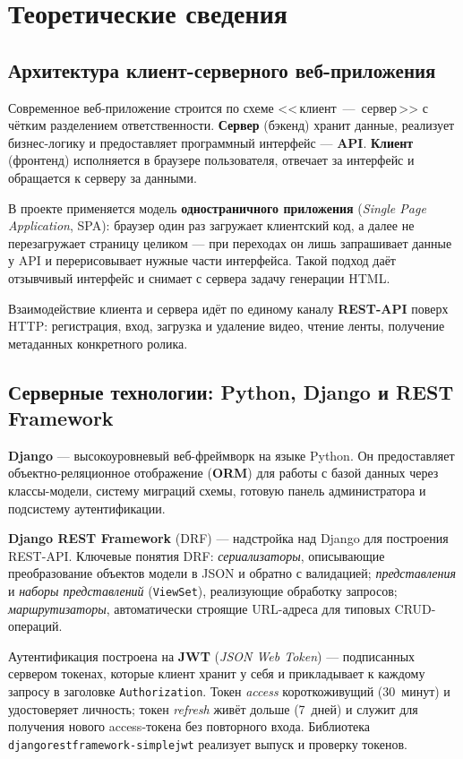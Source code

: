 \chapter{Теоретические сведения}
\label{ch:theory}

\section{Архитектура клиент-серверного веб-приложения}

Современное веб-приложение строится по схеме <<\,клиент~—~сервер\,>>
с чётким разделением ответственности. \textbf{Сервер} (бэкенд) хранит
данные, реализует бизнес-логику и предоставляет программный интерфейс
— \textbf{API}. \textbf{Клиент} (фронтенд) исполняется в браузере
пользователя, отвечает за интерфейс и обращается к серверу за данными.

В проекте применяется модель \textbf{одностраничного приложения}
(\textit{Single Page Application}, SPA): браузер один раз загружает
клиентский код, а далее не перезагружает страницу целиком — при
переходах он лишь запрашивает данные у API и перерисовывает нужные
части интерфейса. Такой подход даёт отзывчивый интерфейс и снимает с
сервера задачу генерации HTML.

Взаимодействие клиента и сервера идёт по единому каналу
\textbf{REST-API} поверх HTTP: регистрация, вход, загрузка и удаление
видео, чтение ленты, получение метаданных конкретного ролика.

\section{Серверные технологии: Python, Django и REST Framework}

\textbf{Django} — высокоуровневый веб-фреймворк на языке Python. Он
предоставляет объектно-реляционное отображение (\textbf{ORM}) для
работы с базой данных через классы-модели, систему миграций схемы,
готовую панель администратора и подсистему аутентификации.

\textbf{Django REST Framework} (DRF) — надстройка над Django для
построения REST-API. Ключевые понятия DRF: \textit{сериализаторы},
описывающие преобразование объектов модели в JSON и обратно с
валидацией; \textit{представления} и \textit{наборы представлений}
(\texttt{ViewSet}), реализующие обработку запросов; \textit{маршрутизаторы},
автоматически строящие URL-адреса для типовых CRUD-операций.

Аутентификация построена на \textbf{JWT} (\textit{JSON Web Token}) —
подписанных сервером токенах, которые клиент хранит у себя и прикладывает
к каждому запросу в заголовке \texttt{Authorization}. Токен \textit{access}
короткоживущий (30~минут) и удостоверяет личность; токен \textit{refresh}
живёт дольше (7~дней) и служит для получения нового access-токена без
повторного входа. Библиотека \texttt{djangorestframework-simplejwt}
реализует выпуск и проверку токенов.

